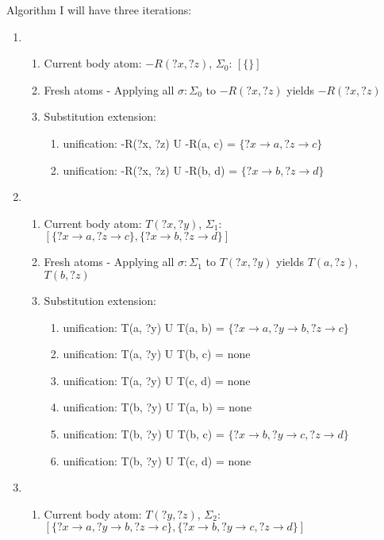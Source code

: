 \documentclass[sigconf,screen,review=false,natbib]{acmart}
\theoremstyle{definition}
\begin{document}
Algorithm I will have three iterations:
\begin{enumerate}
	\item \begin{enumerate}
		      \item Current body atom: $-R(?x, ?z)$, $\Sigma_0$: $[\{\}]$
		      \item Fresh atoms - Applying all $\sigma : \Sigma_0$ to $-R(?x, ?z)$ yields $-R(?x, ?z)$
		      \item Substitution extension: \begin{enumerate}
			            \item unification: -R(?x, ?z) U -R(a, c) = $\{?x \rightarrow a, ?z \rightarrow c\}$
			            \item unification: -R(?x, ?z) U -R(b, d) = $\{?x \rightarrow b, ?z \rightarrow d\}$
		            \end{enumerate}
	      \end{enumerate}
	\item \begin{enumerate}
		      \item Current body atom: $T(?x, ?y)$, $\Sigma_1$: $[\{?x \rightarrow a, ?z \rightarrow c\}, \{?x \rightarrow b, ?z \rightarrow d\}]$
		      \item Fresh atoms - Applying all $\sigma : \Sigma_1$ to $T(?x, ?y)$ yields $T(a, ?z)$, $T(b, ?z)$
		      \item Substitution extension: \begin{enumerate}
			            \item unification: T(a, ?y) U T(a, b) = $\{?x \rightarrow a, ?y \rightarrow b, ?z \rightarrow c\}$
			            \item unification: T(a, ?y) U T(b, c) = none
			            \item unification: T(a, ?y) U T(c, d) = none
			            \item unification: T(b, ?y) U T(a, b) = none
			            \item unification: T(b, ?y) U T(b, c) = $\{?x \rightarrow b, ?y \rightarrow c, ?z \rightarrow d\}$
			            \item unification: T(b, ?y) U T(c, d) = none
		            \end{enumerate}
	      \end{enumerate}
	\item \begin{enumerate}
		      \item Current body atom: $T(?y, ?z)$, $\Sigma_2$: $[\{?x \rightarrow a, ?y \rightarrow b, ?z \rightarrow c\}, \{?x \rightarrow b, ?y \rightarrow c, ?z \rightarrow d\}]$

\end{enumerate}
\end{enumerate}
\end{document}
